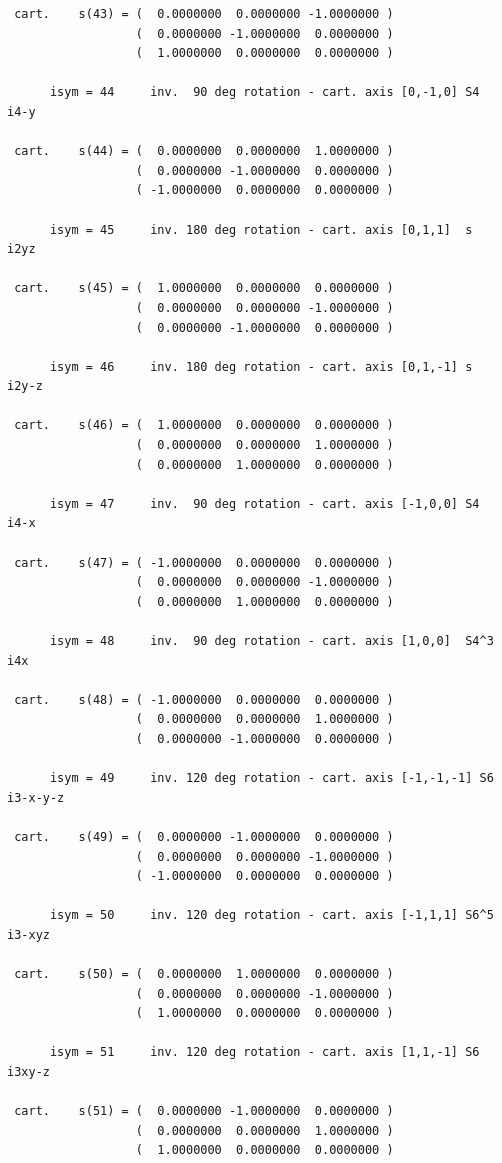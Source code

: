 \documentclass[12pt,a4paper]{article}
\begin{document}
\begin{verbatim}
 cart.    s(43) = (  0.0000000  0.0000000 -1.0000000 )
                  (  0.0000000 -1.0000000  0.0000000 )
                  (  1.0000000  0.0000000  0.0000000 )

      isym = 44     inv.  90 deg rotation - cart. axis [0,-1,0] S4     i4-y

 cart.    s(44) = (  0.0000000  0.0000000  1.0000000 )
                  (  0.0000000 -1.0000000  0.0000000 )
                  ( -1.0000000  0.0000000  0.0000000 )

      isym = 45     inv. 180 deg rotation - cart. axis [0,1,1]  s      i2yz

 cart.    s(45) = (  1.0000000  0.0000000  0.0000000 )
                  (  0.0000000  0.0000000 -1.0000000 )
                  (  0.0000000 -1.0000000  0.0000000 )

      isym = 46     inv. 180 deg rotation - cart. axis [0,1,-1] s      i2y-z

 cart.    s(46) = (  1.0000000  0.0000000  0.0000000 )
                  (  0.0000000  0.0000000  1.0000000 )
                  (  0.0000000  1.0000000  0.0000000 )

      isym = 47     inv.  90 deg rotation - cart. axis [-1,0,0] S4     i4-x

 cart.    s(47) = ( -1.0000000  0.0000000  0.0000000 )
                  (  0.0000000  0.0000000 -1.0000000 )
                  (  0.0000000  1.0000000  0.0000000 )

      isym = 48     inv.  90 deg rotation - cart. axis [1,0,0]  S4^3   i4x

 cart.    s(48) = ( -1.0000000  0.0000000  0.0000000 )
                  (  0.0000000  0.0000000  1.0000000 )
                  (  0.0000000 -1.0000000  0.0000000 )

      isym = 49     inv. 120 deg rotation - cart. axis [-1,-1,-1] S6   i3-x-y-z

 cart.    s(49) = (  0.0000000 -1.0000000  0.0000000 )
                  (  0.0000000  0.0000000 -1.0000000 )
                  ( -1.0000000  0.0000000  0.0000000 )

      isym = 50     inv. 120 deg rotation - cart. axis [-1,1,1] S6^5   i3-xyz

 cart.    s(50) = (  0.0000000  1.0000000  0.0000000 )
                  (  0.0000000  0.0000000 -1.0000000 )
                  (  1.0000000  0.0000000  0.0000000 )

      isym = 51     inv. 120 deg rotation - cart. axis [1,1,-1] S6     i3xy-z

 cart.    s(51) = (  0.0000000 -1.0000000  0.0000000 )
                  (  0.0000000  0.0000000  1.0000000 )
                  (  1.0000000  0.0000000  0.0000000 )


\end{verbatim}
\end{document}
